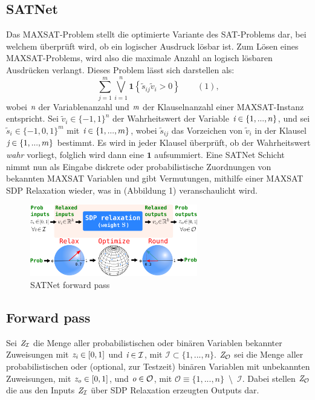 \subsection{SATNet}
\label{sat}
Das MAXSAT-Problem stellt die optimierte Variante des SAT-Problems dar, bei welchem überprüft wird, ob ein logischer Ausdruck lösbar ist. Zum Lösen eines MAXSAT-Problems, wird also die maximale Anzahl an logisch lösbaren Ausdrücken verlangt. Dieses Problem lässt sich darstellen als: 
\[ \sum_{j=1}^m \bigvee_{i=1}^n \boldsymbol{1} \left \{ \tilde{s}_{ij} \tilde{v}_{i} > 0 \right \}\qquad(1),\]
wobei $\emph{n}$ der Variablenanzahl und $\emph{m}$ der Klauselnanzahl einer MAXSAT-Instanz entspricht. Sei $\tilde{v}_{i} \in \{-1, 1\}^n$ der Wahrheitswert der Variable $\emph{i} \in \{1,...,n\}$, und sei $\tilde{s}_{i} \in \{-1, 0, 1\}^m$ mit $\emph{i} \in \{1,...,m\}$, wobei $\tilde{s}_{ij}$ das Vorzeichen von $\tilde{v}_{i}$ in der Klausel $\emph{j} \in \{1,...,m\}$ bestimmt. Es wird in jeder Klausel überprüft, ob der Wahrheitswert \emph{wahr} vorliegt, folglich wird dann eine $\boldsymbol{1}$ aufsummiert. Eine SATNet Schicht nimmt nun als Eingabe diskrete oder probabilistische Zuordnungen von bekannten MAXSAT Variablen und gibt Vermutungen, mithilfe einer \mbox{MAXSAT} SDP Relaxation\cite{https://doi.org/10.48550/arxiv.1706.00476} wieder, was in (Abbildung 1) veranschaulicht wird. \cite[p.~2-3]{https://doi.org/10.48550/arxiv.1905.12149}
\begin{figure}[h]
 \centering
 \includegraphics[width=0.65\textwidth]{images/poster_forward.png}
 \caption{SATNet forward pass \cite{githubrepo}}
 \label{fig:forward}
\end{figure}
\subsection{Forward pass}
Sei $\emph{Z}_{\mathcal{I}}$ die Menge aller probabilistischen oder binären Variablen bekannter Zuweisungen mit $\emph{z}_{\emph{i}} \in [0, 1]$ und $\emph{i} \in \mathcal{I}$, mit $\mathcal{I} \subset \{1,...,n\}$. $\emph{Z}_{\mathcal{O}}$ sei die Menge aller probabilistischen oder (optional, zur Testzeit) binären Variablen mit unbekannten Zuweisungen, mit $\emph{z}_{\emph{o}} \in [0, 1]$, und $\emph{o} \in \mathcal{O}$, mit $\mathcal{O} \equiv \{1,...,n\}$~\textbackslash~$\mathcal{I}$. Dabei stellen $\emph{Z}_{\mathcal{O}}$ die aus den Inputs $\emph{Z}_{\mathcal{I}}$ über SDP Relaxation erzeugten Outputs dar.
\label{subsec:forward}
\cite[p.~3]{https://doi.org/10.48550/arxiv.1905.12149}
